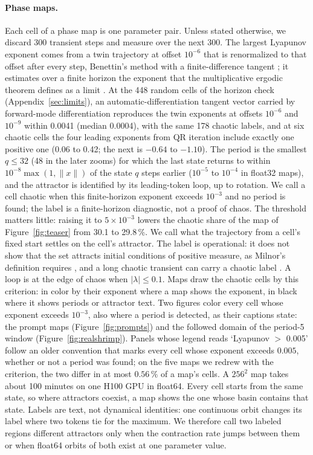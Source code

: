 \documentclass[11pt,letterpaper]{article}
\begin{document}
\paragraph{Phase maps.} Each cell of a phase map is one parameter pair. Unless stated otherwise, we discard 300
transient steps and measure over the next 300. The largest Lyapunov exponent comes from a twin trajectory at
offset $10^{-6}$ that is renormalized to that offset after every step, Benettin's method with a finite-difference
tangent \cite{benettin1980lyapunovI,benettin1980lyapunovII}; it estimates over a finite horizon the exponent that the
multiplicative ergodic theorem defines as a limit \cite{oseledets1968multiplicative}. At the 448 random cells of the
horizon check (Appendix~\ref{sec:limits}), an automatic-differentiation tangent vector carried by forward-mode differentiation
reproduces the twin exponents at offsets $10^{-6}$ and $10^{-9}$ within 0.0041 (median 0.0004), with the same 178
chaotic labels, and at six chaotic cells the four leading exponents from QR iteration include exactly one positive one
(0.06 to 0.42; the next is $-0.64$ to $-1.10$). The period is the smallest $q\le32$ (48 in the later zooms) for which the last state returns
to within $10^{-8}\max(1,\lVert x\rVert)$ of the state $q$ steps earlier ($10^{-5}$ to $10^{-4}$ in float32 maps), and
the attractor is identified by its leading-token loop, up to rotation. We call a cell chaotic when this
finite-horizon exponent exceeds $10^{-3}$ and no period is found; the label is a finite-horizon diagnostic, not a
proof of chaos. The threshold matters little: raising it to $5\times10^{-3}$ lowers the chaotic share of the map of
Figure~\ref{fig:teaser} from 30.1 to 29.8\,\%. We call what the trajectory from a cell's fixed start settles on the cell's attractor. The label is
operational: it does not show that the set attracts initial conditions of positive measure, as Milnor's definition
requires \cite{milnor1985concept}, and a long chaotic transient can carry a chaotic label \cite{grebogi1983crises}. A
loop is at the edge of chaos when $|\lambda|\le0.1$. Maps draw the chaotic cells by this criterion: in color by their exponent where a map shows the exponent, in
black where it shows periods or attractor text. Two figures color every cell whose exponent exceeds $10^{-3}$, also
where a period is detected, as their captions state: the prompt maps (Figure~\ref{fig:prompts}) and the followed
domain of the period-5 window (Figure~\ref{fig:realshrimp}). Panels whose legend reads `Lyapunov $>$ 0.005' follow an older
convention that marks every cell whose exponent exceeds $0.005$, whether or not a period was found; on the five maps
we redrew with the criterion, the two differ in at most $0.56\,\%$ of a map's cells. A $256^2$ map takes about 100 minutes on one H100 GPU in float64. Every cell starts from the same
state, so where attractors coexist, a map shows the one whose basin contains that state. Labels are text, not
dynamical identities: one continuous orbit changes its label where two tokens tie for the maximum. We therefore call
two labeled regions different attractors only when the contraction rate jumps between them or when float64 orbits of
both exist at one parameter value.
\end{document}

